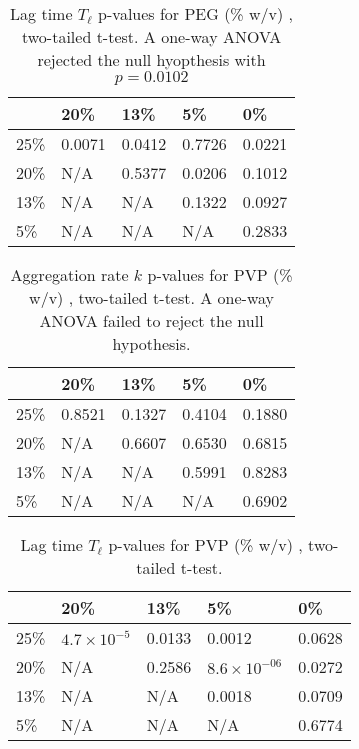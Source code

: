 \begin{table}[b!]
  \caption[Lag time p-values for PEG.]{Lag time $T_\ell$ p-values for PEG (\% w/v) , two-tailed t-test. A one-way ANOVA rejected the null hyopthesis with $p=0.0102$}
    \label{table:p-tl-values-peg}
    \begin{tabular}{p{2cm}|p{3cm}p{3cm}p{3cm}p{3cm}}
        &20\% &  13\% & 5\% & 0\% \\ \hline
	25\% & 0.0071 & 0.0412 & 0.7726 &0.0221\\
	20\% & N/A &0.5377 &  0.0206 & 0.1012\\
     	13\% & N/A  & N/A & 0.1322 & 0.0927\\
      	5\% & N/A & N/A  & N/A &0.2833\\
    \end{tabular}
\end{table}

\begin{table}[b!]
  \caption[Aggregation rate p-values for PVP.]{Aggregation rate $k$ p-values for PVP (\% w/v) , two-tailed t-test. A one-way ANOVA failed to reject the null hypothesis.}
    \label{table:p-k-values-peg}
    \begin{tabular}{p{2cm}|p{3cm}p{3cm}p{3cm}p{3cm}}
        &20\% &  13\% & 5\% & 0\% \\ \hline
	25\% & 0.8521 & 0.1327 & 0.4104 &0.1880\\
	20\% & N/A &0.6607 & 0.6530 & 0.6815\\
     	13\% & N/A  & N/A & 0.5991 & 0.8283\\
      	5\% & N/A & N/A  & N/A & 0.6902\\
    \end{tabular}
\end{table}

\begin{table}[b!]
  \caption[Lag time p-values for PVP.]{Lag time $T_\ell$ p-values for PVP (\% w/v) , two-tailed t-test.}
    \label{table:p-tl-values-pvp}
    \begin{tabular}{p{2cm}|p{3cm}p{3cm}p{3cm}p{3cm}}
        &20\% &  13\% & 5\% & 0\% \\ \hline
	25\% & $4.7\times 10^{-5}$ & 0.0133 & 0.0012 &0.0628\\
	20\% & N/A &0.2586 &  $8.6\times 10^{-06}$ & 0.0272\\
     	13\% & N/A  & N/A & 0.0018 & 0.0709\\
      	5\% & N/A & N/A  & N/A &0.6774\\
    \end{tabular}
\end{table}